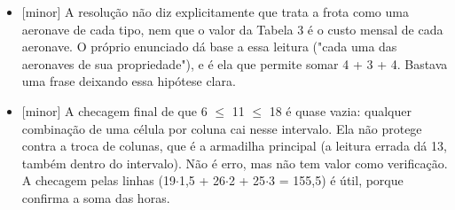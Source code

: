 \documentclass{article}%
\begin{document}
\begin{itemize}%
\item%
{[}minor{]} A resolução não diz explicitamente que trata a frota como uma aeronave de cada tipo, nem que o valor da Tabela 3 é o custo mensal de cada aeronave. O próprio enunciado dá base a essa leitura ("cada uma das aeronaves de sua propriedade"), e é ela que permite somar 4 + 3 + 4. Bastava uma frase deixando essa hipótese clara.%
\item%
{[}minor{]} A checagem final de que 6 $\leq$ 11 $\leq$ 18 é quase vazia: qualquer combinação de uma célula por coluna cai nesse intervalo. Ela não protege contra a troca de colunas, que é a armadilha principal (a leitura errada dá 13, também dentro do intervalo). Não é erro, mas não tem valor como verificação. A checagem pelas linhas (19$\cdot$1,5 + 26$\cdot$2 + 25$\cdot$3 = 155,5) é útil, porque confirma a soma das horas.%
\end{itemize}%
\end{document}
